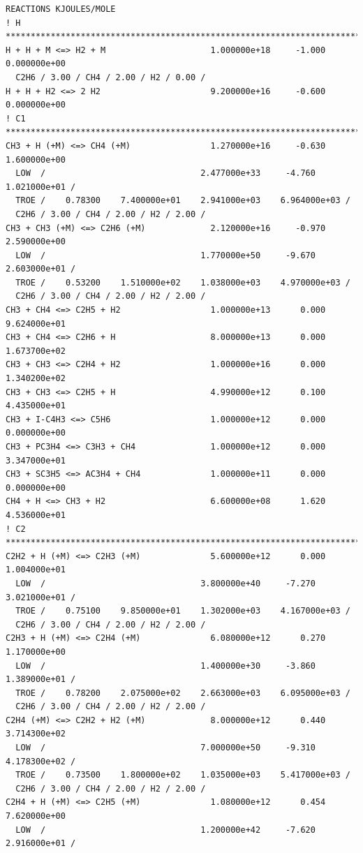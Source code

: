 \begin{verbatim}
REACTIONS KJOULES/MOLE
! H ****************************************************************************
H + H + M <=> H2 + M                     1.000000e+18     -1.000    0.000000e+00
  C2H6 / 3.00 / CH4 / 2.00 / H2 / 0.00 / 
H + H + H2 <=> 2 H2                      9.200000e+16     -0.600    0.000000e+00
! C1 ***************************************************************************
CH3 + H (+M) <=> CH4 (+M)                1.270000e+16     -0.630    1.600000e+00
  LOW  /                               2.477000e+33     -4.760    1.021000e+01 /
  TROE /    0.78300    7.400000e+01    2.941000e+03    6.964000e+03 /
  C2H6 / 3.00 / CH4 / 2.00 / H2 / 2.00 / 
CH3 + CH3 (+M) <=> C2H6 (+M)             2.120000e+16     -0.970    2.590000e+00
  LOW  /                               1.770000e+50     -9.670    2.603000e+01 /
  TROE /    0.53200    1.510000e+02    1.038000e+03    4.970000e+03 /
  C2H6 / 3.00 / CH4 / 2.00 / H2 / 2.00 / 
CH3 + CH4 <=> C2H5 + H2                  1.000000e+13      0.000    9.624000e+01
CH3 + CH4 <=> C2H6 + H                   8.000000e+13      0.000    1.673700e+02
CH3 + CH3 <=> C2H4 + H2                  1.000000e+16      0.000    1.340200e+02
CH3 + CH3 <=> C2H5 + H                   4.990000e+12      0.100    4.435000e+01
CH3 + I-C4H3 <=> C5H6                    1.000000e+12      0.000    0.000000e+00
CH3 + PC3H4 <=> C3H3 + CH4               1.000000e+12      0.000    3.347000e+01
CH3 + SC3H5 <=> AC3H4 + CH4              1.000000e+11      0.000    0.000000e+00
CH4 + H <=> CH3 + H2                     6.600000e+08      1.620    4.536000e+01
! C2 ***************************************************************************
C2H2 + H (+M) <=> C2H3 (+M)              5.600000e+12      0.000    1.004000e+01
  LOW  /                               3.800000e+40     -7.270    3.021000e+01 /
  TROE /    0.75100    9.850000e+01    1.302000e+03    4.167000e+03 /
  C2H6 / 3.00 / CH4 / 2.00 / H2 / 2.00 / 
C2H3 + H (+M) <=> C2H4 (+M)              6.080000e+12      0.270    1.170000e+00
  LOW  /                               1.400000e+30     -3.860    1.389000e+01 /
  TROE /    0.78200    2.075000e+02    2.663000e+03    6.095000e+03 /
  C2H6 / 3.00 / CH4 / 2.00 / H2 / 2.00 / 
C2H4 (+M) <=> C2H2 + H2 (+M)             8.000000e+12      0.440    3.714300e+02
  LOW  /                               7.000000e+50     -9.310    4.178300e+02 /
  TROE /    0.73500    1.800000e+02    1.035000e+03    5.417000e+03 /
  C2H6 / 3.00 / CH4 / 2.00 / H2 / 2.00 / 
C2H4 + H (+M) <=> C2H5 (+M)              1.080000e+12      0.454    7.620000e+00
  LOW  /                               1.200000e+42     -7.620    2.916000e+01 /

\end{verbatim}
